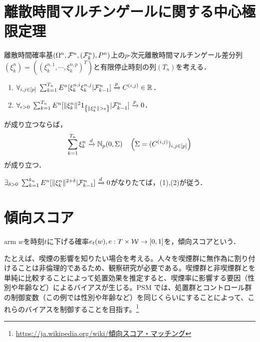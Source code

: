 \documentclass[uplatex,dvipdfmx]{jsreport}
\begin{document}
\section{離散時間マルチンゲールに関する中心極限定理}

\begin{theorem}
    離散時間確率基$(\Omega^n,\mathcal{F}^n,(\mathcal{F}^n_k),P^n)$上の$p$-次元離散時間マルチンゲール差分列$(\xi^n_k)=((\xi^{n,1}_k,\cdots,\xi^{n,p}_k)^T)$と有限停止時刻の列$(T_n)$を考える．
    \begin{enumerate}
        \item $\forall_{i,j\in[p]}\;\sum^{T_n}_{k=1}E^n[\xi^{n,i}_k\xi^{n,j}_k|\mathcal{F}^n_{k-1}]\xrightarrow{p}C^{(i,j)}\in\mathbb{R}$．
        \item $\forall_{\ep>0}\;\sum^{T_n}_{k=1}E^n[\norm{\xi^n_k}^21_{\Brace{\norm{\xi^n_k}>\ep}}|\F^n_{k-1}]\xrightarrow{p}0$．
    \end{enumerate}
    が成り立つならば，
    \[\sum^{T_n}_{k=1}\xi^n_k\xrightarrow{d}\mathbb{N}_p(0,\Sigma)\quad\left(\Sigma=(C^{(i,j)})_{i,j\in[p]}\right)\]
    が成り立つ．
\end{theorem}

\begin{lemma}
    $\exists_{\delta>0}\;\sum^{k_n}_{k=1}E^n[\|\xi^n_k\|^{2+\delta}|\mathcal{F}^n_{k-1}]\xrightarrow{d}0$がなりたてば，(1),(2)が従う．
\end{lemma}

\section{傾向スコア}

\begin{tcolorbox}[colframe=ForestGreen, colback=ForestGreen!10!white,breakable,colbacktitle=ForestGreen!40!white,coltitle=black,fonttitle=\bfseries\sffamily,
title=]
    arm $w$を時刻$t$に下げる確率$e_t(w),e:T\times\mathcal{W}\to[0,1]$を，傾向スコアという．
\end{tcolorbox}

たとえば、喫煙の影響を知りたい場合を考える。人々を喫煙群に無作為に割り付けることは非倫理的であるため、観察研究が必要である。喫煙群と非喫煙群とを単純に比較することによって処置効果を推定すると、喫煙率に影響する要因（性別や年齢など）によるバイアスが生じる。PSM では、処置群とコントロール群の制御変数（この例では性別や年齢など）を同じくらいにすることによって、これらのバイアスを制御することを目指す。\footnote{\url{https://ja.wikipedia.org/wiki/傾向スコア・マッチング}}
\end{document}

